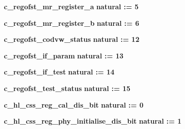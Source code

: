 \begin{DoxyCompactItemize}
\item 
{\bf c\+\_\+regofst\+\_\+mr\+\_\+register\+\_\+a} {\bfseries \textcolor{comment}{natural}\textcolor{vhdlchar}{ }\textcolor{vhdlchar}{ }\textcolor{vhdlchar}{\+:}\textcolor{vhdlchar}{=}\textcolor{vhdlchar}{ }\textcolor{vhdlchar}{ } \textcolor{vhdldigit}{5} \textcolor{vhdlchar}{ }} 
\item 
{\bf c\+\_\+regofst\+\_\+mr\+\_\+register\+\_\+b} {\bfseries \textcolor{comment}{natural}\textcolor{vhdlchar}{ }\textcolor{vhdlchar}{ }\textcolor{vhdlchar}{\+:}\textcolor{vhdlchar}{=}\textcolor{vhdlchar}{ }\textcolor{vhdlchar}{ } \textcolor{vhdldigit}{6} \textcolor{vhdlchar}{ }} 
\item 
{\bf c\+\_\+regofst\+\_\+codvw\+\_\+status} {\bfseries \textcolor{comment}{natural}\textcolor{vhdlchar}{ }\textcolor{vhdlchar}{ }\textcolor{vhdlchar}{\+:}\textcolor{vhdlchar}{=}\textcolor{vhdlchar}{ }\textcolor{vhdlchar}{ } \textcolor{vhdldigit}{12} \textcolor{vhdlchar}{ }} 
\item 
{\bf c\+\_\+regofst\+\_\+if\+\_\+param} {\bfseries \textcolor{comment}{natural}\textcolor{vhdlchar}{ }\textcolor{vhdlchar}{ }\textcolor{vhdlchar}{\+:}\textcolor{vhdlchar}{=}\textcolor{vhdlchar}{ }\textcolor{vhdlchar}{ } \textcolor{vhdldigit}{13} \textcolor{vhdlchar}{ }} 
\item 
{\bf c\+\_\+regofst\+\_\+if\+\_\+test} {\bfseries \textcolor{comment}{natural}\textcolor{vhdlchar}{ }\textcolor{vhdlchar}{ }\textcolor{vhdlchar}{\+:}\textcolor{vhdlchar}{=}\textcolor{vhdlchar}{ }\textcolor{vhdlchar}{ } \textcolor{vhdldigit}{14} \textcolor{vhdlchar}{ }} 
\item 
{\bf c\+\_\+regofst\+\_\+test\+\_\+status} {\bfseries \textcolor{comment}{natural}\textcolor{vhdlchar}{ }\textcolor{vhdlchar}{ }\textcolor{vhdlchar}{\+:}\textcolor{vhdlchar}{=}\textcolor{vhdlchar}{ }\textcolor{vhdlchar}{ } \textcolor{vhdldigit}{15} \textcolor{vhdlchar}{ }} 
\item 
{\bf c\+\_\+hl\+\_\+css\+\_\+reg\+\_\+cal\+\_\+dis\+\_\+bit} {\bfseries \textcolor{comment}{natural}\textcolor{vhdlchar}{ }\textcolor{vhdlchar}{ }\textcolor{vhdlchar}{\+:}\textcolor{vhdlchar}{=}\textcolor{vhdlchar}{ }\textcolor{vhdlchar}{ } \textcolor{vhdldigit}{0} \textcolor{vhdlchar}{ }} 
\item 
{\bf c\+\_\+hl\+\_\+css\+\_\+reg\+\_\+phy\+\_\+initialise\+\_\+dis\+\_\+bit} {\bfseries \textcolor{comment}{natural}\textcolor{vhdlchar}{ }\textcolor{vhdlchar}{ }\textcolor{vhdlchar}{\+:}\textcolor{vhdlchar}{=}\textcolor{vhdlchar}{ }\textcolor{vhdlchar}{ } \textcolor{vhdldigit}{1} \textcolor{vhdlchar}{ }} 

\end{DoxyCompactItemize}
